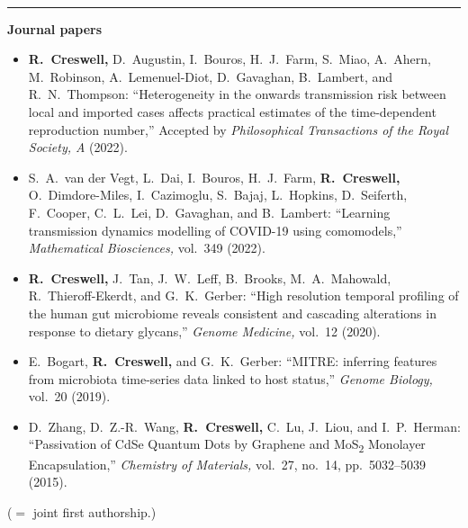 \documentclass[11pt]{article}
\begin{document}
\vspace{0.6cm}




\vspace{-2.75mm} \\
\rule{\textwidth}{0.4pt}
\vspace*{.5cm}
\noindent\textbf{Journal papers}
\begin{itemize}[leftmargin=*]
\setlength{\itemsep}{4pt}
\setlength{\parskip}{0pt}
\setlength{\parsep}{0pt}
\vspace*{-.5cm}



\item \textbf{R.\ Creswell,\textsuperscript{\dag}} {\color{gray}D.\ Augustin,\textsuperscript{\dag} I.\ Bouros,\textsuperscript{\dag} H.\ J.\ Farm,\textsuperscript{\dag} S.\ Miao,\textsuperscript{\dag} A.\ Ahern,\textsuperscript{\dag} M.\ Robinson, A.\ Lemenuel-Diot, D.\ Gavaghan, B.\ Lambert, and R.\ N.\ Thompson:} ``Heterogeneity in the onwards transmission risk between local and imported cases affects practical estimates of the time-dependent reproduction number,'' Accepted by \emph{Philosophical Transactions of the Royal Society, A} (2022).

\item {\color{gray} S.\ A.\ van der Vegt,\textsuperscript{\dag} L.\ Dai,\textsuperscript{\dag} I.\ Bouros,\textsuperscript{\dag} H.\ J.\ Farm,\textsuperscript{\dag} \textbf{\color{black}R.\ Creswell,\textsuperscript{\dag}} O.\ Dimdore-Miles,\textsuperscript{\dag} I.\ Cazimoglu, S.\ Bajaj, L.\ Hopkins, D.\ Seiferth, F.\ Cooper, C.\ L.\ Lei, D.\ Gavaghan, and B.\ Lambert:} ``Learning transmission dynamics modelling of COVID-19 using comomodels,'' \emph{Mathematical Biosciences,} vol.\ 349 (2022).

\item \textbf{R.\ Creswell,\textsuperscript{\dag}} {\color{gray}J.\ Tan,\textsuperscript{\dag} J.\ W.\ Leff, B.\ Brooks, M.\ A.\ Mahowald, R.\ Thieroff-Ekerdt, and G.\ K.\ Gerber:} ``High resolution temporal profiling of the human gut microbiome reveals consistent and cascading alterations in response to dietary glycans,'' \emph{Genome Medicine,} vol.\ 12 (2020).

\item {\color{gray} E.\ Bogart, \textbf{\color{black}R.\ Creswell,} and G.\ K.\ Gerber:} ``MITRE: inferring features from microbiota time-series data linked to host status,'' \emph{Genome Biology,} vol.\ 20 (2019).

\item {\color{gray} D.\ Zhang, D.\ Z.-R.\ Wang, \textbf{\color{black}R.\ Creswell,} C.\ Lu, J.\ Liou, and I.\ P.\ Herman:} ``Passivation of CdSe Quantum Dots by Graphene and MoS\textsubscript{2} Monolayer Encapsulation,'' \emph{Chemistry of Materials,} vol.\ 27, no.\ 14, pp.\ 5032--5039 (2015).
\end{itemize}
\hfill(\textsuperscript{\dag}$=$ joint first authorship.)
\end{document}
